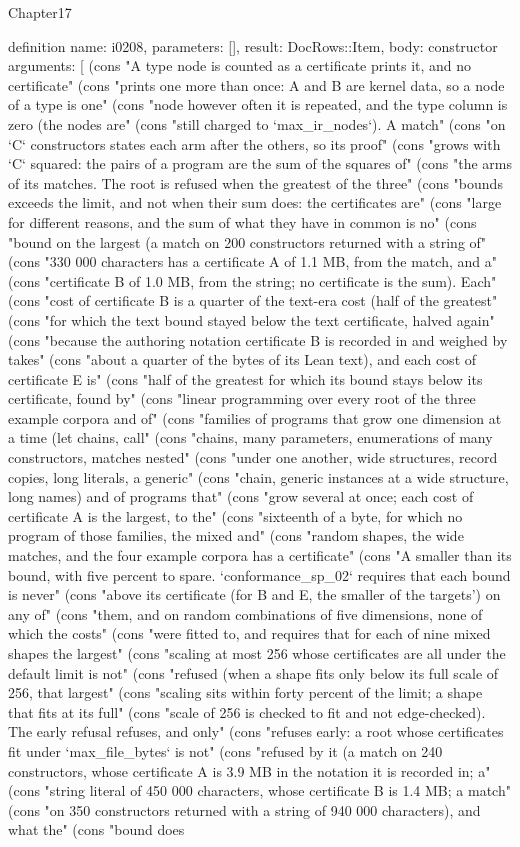 \begin{lexlean}{Chapter17}
\begin{semanticmodule}
definition{
  name: i0208,
  parameters: [],
  result: DocRows::Item,
  body: constructor{
    arguments: [
      (cons "A type node is counted as a certificate prints it, and no certificate" (cons "prints one more than once: A and B are kernel data, so a node of a type is one" (cons "node however often it is repeated, and the type column is zero (the nodes are" (cons "still charged to `max_ir_nodes`). A match" (cons "on `C` constructors states each arm after the others, so its proof" (cons "grows with `C` squared: the pairs of a program are the sum of the squares of" (cons "the arms of its matches. The root is refused when the greatest of the three" (cons "bounds exceeds the limit, and not when their sum does: the certificates are" (cons "large for different reasons, and the sum of what they have in common is no" (cons "bound on the largest (a match on 200 constructors returned with a string of" (cons "330 000 characters has a certificate A of 1.1 MB, from the match, and a" (cons "certificate B of 1.0 MB, from the string; no certificate is the sum). Each" (cons "cost of certificate B is a quarter of the text-era cost (half of the greatest" (cons "for which the text bound stayed below the text certificate, halved again" (cons "because the authoring notation certificate B is recorded in and weighed by takes" (cons "about a quarter of the bytes of its Lean text), and each cost of certificate E is" (cons "half of the greatest for which its bound stays below its certificate, found by" (cons "linear programming over every root of the three example corpora and of" (cons "families of programs that grow one dimension at a time (let chains, call" (cons "chains, many parameters, enumerations of many constructors, matches nested" (cons "under one another, wide structures, record copies, long literals, a generic" (cons "chain, generic instances at a wide structure, long names) and of programs that" (cons "grow several at once; each cost of certificate A is the largest, to the" (cons "sixteenth of a byte, for which no program of those families, the mixed and" (cons "random shapes, the wide matches, and the four example corpora has a certificate" (cons "A smaller than its bound, with five percent to spare. `conformance_sp_02` requires that each bound is never" (cons "above its certificate (for B and E, the smaller of the targets') on any of" (cons "them, and on random combinations of five dimensions, none of which the costs" (cons "were fitted to, and requires that for each of nine mixed shapes the largest" (cons "scaling at most 256 whose certificates are all under the default limit is not" (cons "refused (when a shape fits only below its full scale of 256, that largest" (cons "scaling sits within forty percent of the limit; a shape that fits at its full" (cons "scale of 256 is checked to fit and not edge-checked). The early refusal refuses, and only" (cons "refuses early: a root whose certificates fit under `max_file_bytes` is not" (cons "refused by it (a match on 240 constructors, whose certificate A is 3.9 MB in the notation it is recorded in; a" (cons "string literal of 450 000 characters, whose certificate B is 1.4 MB; a match" (cons "on 350 constructors returned with a string of 940 000 characters), and what the" (cons "bound does }}
\end{semanticmodule}
\end{lexlean}

